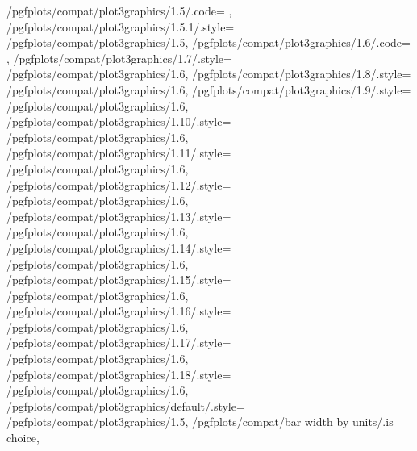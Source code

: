 {	/pgfplots/compat/plot3graphics/1.5/.code=		{\def\b@pgfplots@compat@plot@graphics@threedim{1}},%
	/pgfplots/compat/plot3graphics/1.5.1/.style=	{/pgfplots/compat/plot3graphics/1.5},%
	/pgfplots/compat/plot3graphics/1.6/.code=		{\def\b@pgfplots@compat@plot@graphics@threedim{2}},%
	/pgfplots/compat/plot3graphics/1.7/.style=	{/pgfplots/compat/plot3graphics/1.6},%
	/pgfplots/compat/plot3graphics/1.8/.style=	{/pgfplots/compat/plot3graphics/1.6},%
	/pgfplots/compat/plot3graphics/1.9/.style=	{/pgfplots/compat/plot3graphics/1.6},%
	/pgfplots/compat/plot3graphics/1.10/.style=	{/pgfplots/compat/plot3graphics/1.6},%
	/pgfplots/compat/plot3graphics/1.11/.style=	{/pgfplots/compat/plot3graphics/1.6},%
	/pgfplots/compat/plot3graphics/1.12/.style=	{/pgfplots/compat/plot3graphics/1.6},%
	/pgfplots/compat/plot3graphics/1.13/.style=	{/pgfplots/compat/plot3graphics/1.6},%
	/pgfplots/compat/plot3graphics/1.14/.style=	{/pgfplots/compat/plot3graphics/1.6},%
	/pgfplots/compat/plot3graphics/1.15/.style=	{/pgfplots/compat/plot3graphics/1.6},%
	/pgfplots/compat/plot3graphics/1.16/.style=	{/pgfplots/compat/plot3graphics/1.6},%
	/pgfplots/compat/plot3graphics/1.17/.style=	{/pgfplots/compat/plot3graphics/1.6},%
	/pgfplots/compat/plot3graphics/1.18/.style=	{/pgfplots/compat/plot3graphics/1.6},%
	/pgfplots/compat/plot3graphics/default/.style=	{/pgfplots/compat/plot3graphics/1.5},%
	/pgfplots/compat/bar width by units/.is choice,
}
